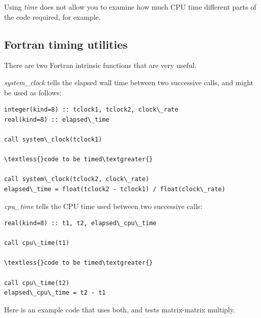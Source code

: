 \documentclass[letterpaper,10pt,english]{sphinxmanual}
\begin{document}
Using \emph{time} does not allow you to examine how much CPU time different parts
of the code required, for example.


\subsection{Fortran timing utilities}
\label{timing:timing-fortran}\label{timing:fortran-timing-utilities}
There are two Fortran intrinsic functions that are very useful.

\emph{system\_clock} tells the elapsed wall time between two successive calls, and
might be used as follows:

\begin{Verbatim}[commandchars=\\\{\}]
integer(kind=8) :: tclock1, tclock2, clock\_rate
real(kind=8) :: elapsed\_time

call system\_clock(tclock1)

\textless{}code to be timed\textgreater{}

call system\_clock(tclock2, clock\_rate)
elapsed\_time = float(tclock2 - tclock1) / float(clock\_rate)
\end{Verbatim}

\emph{cpu\_time} tells the CPU time used between two successive calls:

\begin{Verbatim}[commandchars=\\\{\}]
real(kind=8) :: t1, t2, elapsed\_cpu\_time

call cpu\_time(t1)

\textless{}code to be timed\textgreater{}

call cpu\_time(t2)
elapsed\_cpu\_time = t2 - t1
\end{Verbatim}

Here is an example code that uses both, and tests matrix-matrix multiply.
\end{document}
